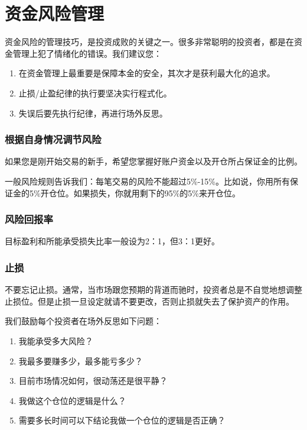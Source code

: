 \section {资金风险管理}

    资金风险的管理技巧，是投资成败的关键之一。很多非常聪明的投资者，都是在资金管理上犯了情绪化的错误。我们建议您：
    \begin{enumerate}
        \item  在资金管理上最重要是保障本金的安全，其次才是获利最大化的追求。
        \item  止损/止盈纪律的执行要坚决实行程式化。
        \item  失误后要先执行纪律，再进行场外反思。
    \end{enumerate}

\subsubsection {根据自身情况调节风险}

    如果您是刚开始交易的新手，希望您掌握好账户资金以及开仓所占保证金的比例。

    一般风险规则告诉我们：每笔交易的风险不能超过5\%-15\%。比如说，你用所有保证金的5\%开仓位。如果损失，你就用剩下的95\%的5\%来开仓位。

\subsubsection {风险回报率}

    目标盈利和所能承受损失比率一般设为2：1，但3：1更好。

\subsubsection {止损}

    不要忘记止损。通常，当市场跟您预期的背道而驰时，投资者总是不自觉地想调整止损位。但是止损一旦设定就请不要更改，否则止损就失去了保护资产的作用。

    我们鼓励每个投资者在场外反思如下问题：

    \begin{enumerate}
        \item  我能承受多大风险？
        \item  我最多要赚多少，最多能亏多少？
        \item  目前市场情况如何，很动荡还是很平静？
        \item  我做这个仓位的逻辑是什么？
        \item  需要多长时间可以下结论我做一个仓位的逻辑是否正确？
    \end{enumerate}
